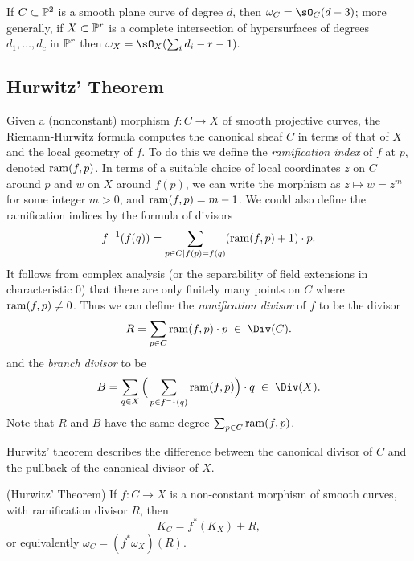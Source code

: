 \begin{corollary}\label{canonical of plane curve}
If $C\subset \PP^{2}$ is a smooth plane curve of degree $d$, then $\omega_{C} = \sO_{C}(d-3)$; more generally, if
$X\subset \PP^{r}$ is a complete intersection of hypersurfaces of degrees $d_{1},\dots, d_{c}$ in $\PP^r$ then
$\omega_{X} = \sO_{X}(\sum_{i}d_{i }-r-1).$
\end{corollary}

\subsection{Hurwitz' Theorem}
 Given a (nonconstant) morphism $f : C \to X$ of smooth projective curves, the Riemann-Hurwitz formula computes the canonical sheaf  $C$ in terms of that of  $X$ and the local geometry of $f$. To do this we define the
\emph{ramification index} of $f$ at $p$,  denoted $\ram(f,p)$. In terms of a suitable choice of local coordinates $z$ on $C$ around $p$ and $w$ on $X$ around $f(p)$, we can write the morphism as $z \mapsto w = z^m$ for some integer $m > 0$, and $\ram(f,p) = m-1$. We could also define the ramification indices
by the formula of divisors
$$
 f^{-1}(f(q)) = \sum_{p\in C \mid f(p)=f(q)} (\ram(f,p)+1)\cdot p.
 $$
It follows from complex analysis (or the separability of field extensions in characteristic 0) that there are only finitely many
points on $C$ where $\ram(f,p) \neq 0$. Thus we can define the \emph{ramification divisor} of $f$ to be the divisor
 $$
 R = \sum_{p \in C} \ram(f,p)\cdot p \; \in \;  \Div(C).
 $$
 and the \emph{branch divisor} to be
 $$
 B = \sum_{q \in X} \Big(\sum_{p \in f^{-1}(q)} \ram(f,p) \Big)\cdot q \; \in \; \Div(X).
 $$
 Note that $R$ and $B$ have the same degree $\sum_{p \in C} \ram(f,p)$. 

 Hurwitz' theorem describes the difference between the canonical divisor of $C$ and the pullback of the canonical divisor of $X$.
\begin{theorem}(Hurwitz' Theorem) \cite[****]{H} \label{Hurwitz}
If $f:C\to X$ is a non-constant morphism of smooth curves, with ramification divisor $R$, then 
$$
K_C = f^{*}(K_{X})+R,$$
or equivalently
$
\omega_{C} = (f^{*}\omega_{X})(R).
$
\end{theorem}
 
